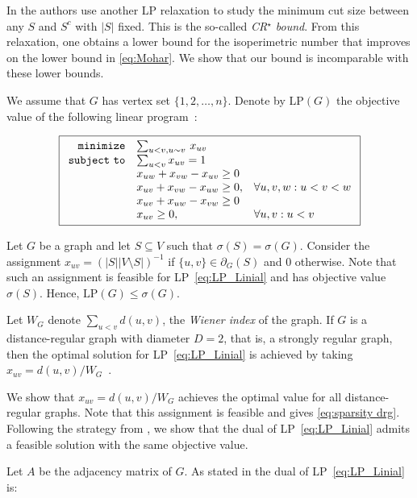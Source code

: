 \documentclass[a4paper,11pt]{article}
\theoremstyle{definition}
\begin{document}
In \cite{DM2019} the authors use another LP relaxation to study the minimum cut size between any $S$ and $S^c$ with $|S|$ fixed. This is the so-called \emph{CR$^\star$ bound}. From this relaxation, one obtains a lower bound for the isoperimetric number that improves on the lower bound in \ref{eq:Mohar}. We show that our bound is incomparable with these lower bounds.\break

We assume that $G$ has vertex set $\{1,2,\ldots, n\}$. Denote by $\text{LP}(G)$ the objective value of the following linear program~\cite{LLR1995}:

\begin{equation}\label{eq:LP_Linial}
\boxed{
\begin{array}{rll}
{\tt minimize} & \sum_{u<v, u \sim v} \, x_{uv} \\
{\tt subject\ to} & \sum_{u < v} x_{uv} = 1 \\
& x_{uw} + x_{vw} - x_{uv} \geq 0\\
& x_{uv} + x_{vw} - x_{uw} \geq 0, & \forall u,v,w : u<v<w\\
& x_{uv} + x_{uw} - x_{vw} \geq 0\\
& x_{uv} \geq 0, & \forall u,v: u<v\\
\end{array}}
\end{equation}


Let $G$ be a graph and let $S \subseteq V$ such that $\sigma(S) = \sigma(G)$. Consider the assignment $x_{uv} = (|S||V\setminus S|)^{-1}$ if $\{u, v\} \in \partial_G(S)$ and $0$ otherwise. Note that such an assignment is feasible for LP~\eqref{eq:LP_Linial} and has objective value $\sigma(S)$. Hence, $\text{LP}(G) \leq \sigma(G)$.

Let $W_G$ denote $\sum_{u < v} d(u,v)$, the \emph{Wiener index} of the graph.
If $G$ is a distance-regular graph with diameter $D=2$, that is, a strongly regular graph, then the optimal solution for LP~\eqref{eq:LP_Linial} is achieved by taking $x_{uv}=d(u, v)/W_G$~\cite{S2005}.

We show that $x_{uv} = d(u,v)/W_G$ achieves the optimal value for all distance-regular graphs. Note that this assignment is feasible and 
gives \eqref{eq:sparsity drg}. Following the strategy from \cite{S2005}, we show that the dual of LP~\eqref{eq:LP_Linial} admits a feasible solution with the same objective value. 

Let $A$ be the adjacency matrix of $G$. As stated in \cite{S2005} the dual of LP~\eqref{eq:LP_Linial} is:
\end{document}
